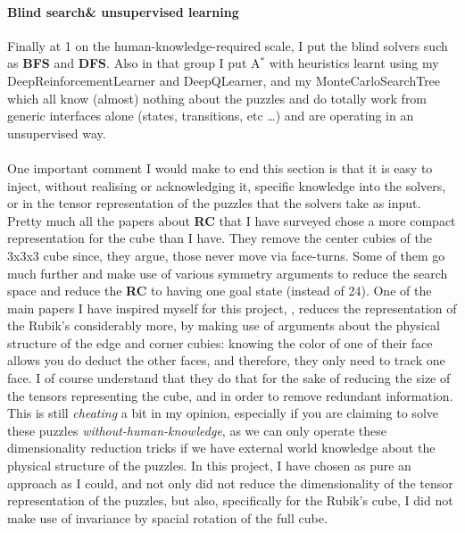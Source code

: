 \paragraph{Blind search\& unsupervised learning}
Finally at 1 on the human-knowledge-required scale, I put the blind solvers such as \textbf{BFS} and \textbf{DFS}. Also in that group I put A$^{*}$ with heuristics learnt using my DeepReinforcementLearner and DeepQLearner, and my MonteCarloSearchTree which all know (almost) nothing about the puzzles and do totally work from generic interfaces alone (states, transitions, etc \dots) and are operating in an unsupervised way.
\\
\\
One important comment I would make to end this section is that it is easy to inject, without realising or acknowledging it, specific knowledge into the solvers, or in the tensor representation of the puzzles that the solvers take as input. Pretty much all the papers about \textbf{RC} that I have surveyed chose a more compact representation for the cube than I have. They remove the center cubies of the 3x3x3 cube since, they argue, those never move via face-turns. Some of them go much further and make use of various symmetry arguments to reduce the search space and reduce the \textbf{RC} to having one goal state (instead of 24). One of the main papers I have inspired myself for this project, \cite{DBLP:journals/corr/abs-1805-07470}, reduces the representation of the Rubik's considerably more, by making use of arguments about the physical structure of the edge and corner cubies: knowing the color of one of their face allows you do deduct the other faces, and therefore, they only need to track one face. I of course understand that they do that for the sake of reducing the size of the tensors representing the cube, and in order to remove redundant information. This is still \textit{cheating} a bit in my opinion, especially if you are claiming to solve these puzzles \textit{without-human-knowledge}, as we can only operate these dimensionality reduction tricks if we have external world knowledge about the physical structure of the puzzles. In this project, I have chosen as pure an approach as I could, and not only did not reduce the dimensionality of the tensor representation of the puzzles, but also, specifically for the Rubik's cube, I did not make use of invariance by spacial rotation of the full cube.



































